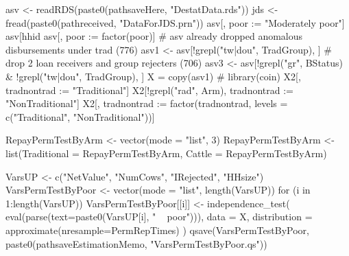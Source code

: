 \begin{Schunk}
\begin{Sinput}
asv <- readRDS(paste0(pathsaveHere, "DestatData.rds"))
jds <- fread(paste0(pathreceived, "DataForJDS.prn"))
asv[, poor := "Moderately poor"]
asv[hhid %
asv[, poor := factor(poor)]
# asv already dropped anomalous disbursements under trad (776)
asv1 <- asv[!grepl("tw|dou", TradGroup), ]
# drop 2 loan receivers and group rejecters (706)
asv3 <- asv[!grepl("gr", BStatus) & !grepl("tw|dou", TradGroup), ]
X = copy(asv1)
# 
library(coin)
X2[, tradnontrad := "Traditional"]
X2[!grepl("rad", Arm), tradnontrad := "NonTraditional"]
X2[, tradnontrad := factor(tradnontrad, levels = c("Traditional", "NonTraditional"))]

RepayPermTestByArm <- vector(mode = "list", 3)
RepayPermTestByArm <- list(Traditional = RepayPermTestByArm, Cattle = RepayPermTestByArm)

VarsUP <- c("NetValue", "NumCows", "IRejected", "HHsize")
VarsPermTestByPoor <- vector(mode = "list", length(VarsUP))
for (i in 1:length(VarsUP)) 
  VarsPermTestByPoor[[i]] <-  independence_test(
      eval(parse(text=paste0(VarsUP[i], " ~ poor"))), 
      data = X, distribution = approximate(nresample=PermRepTimes)
    )
qsave(VarsPermTestByPoor, 
  paste0(pathsaveEstimationMemo, "VarsPermTestByPoor.qs"))
\end{Sinput}
\end{Schunk}

